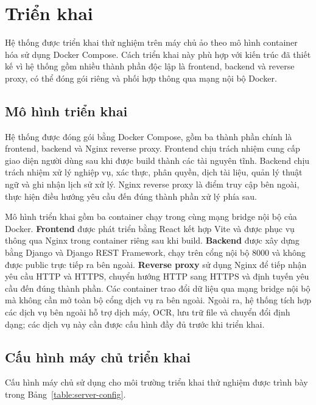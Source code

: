 ﻿\documentclass[../DoAn.tex]{subfiles}
\begin{document}
\section{Triển khai}

Hệ thống được triển khai thử nghiệm trên máy chủ ảo theo mô hình container hóa sử dụng Docker Compose. Cách triển khai này phù hợp với kiến trúc đã thiết kế vì hệ thống gồm nhiều thành phần độc lập là frontend, backend và reverse proxy, có thể đóng gói riêng và phối hợp thông qua mạng nội bộ Docker.

\subsection{Mô hình triển khai}

Hệ thống được đóng gói bằng Docker Compose, gồm ba thành phần chính là frontend, backend và Nginx reverse proxy. Frontend chịu trách nhiệm cung cấp giao diện người dùng sau khi được build thành các tài nguyên tĩnh. Backend chịu trách nhiệm xử lý nghiệp vụ, xác thực, phân quyền, dịch tài liệu, quản lý thuật ngữ và ghi nhận lịch sử xử lý. Nginx reverse proxy là điểm truy cập bên ngoài, thực hiện điều hướng yêu cầu đến đúng thành phần xử lý phía sau.

Mô hình triển khai gồm ba container chạy trong cùng mạng bridge nội bộ của Docker. \textbf{Frontend} được phát triển bằng React kết hợp Vite và được phục vụ thông qua Nginx trong container riêng sau khi build. \textbf{Backend} được xây dựng bằng Django và Django REST Framework, chạy trên cổng nội bộ 8000 và không được public trực tiếp ra bên ngoài. \textbf{Reverse proxy} sử dụng Nginx để tiếp nhận yêu cầu HTTP và HTTPS, chuyển hướng HTTP sang HTTPS và định tuyến yêu cầu đến đúng thành phần. Các container trao đổi dữ liệu qua mạng bridge nội bộ mà không cần mở toàn bộ cổng dịch vụ ra bên ngoài. Ngoài ra, hệ thống tích hợp các dịch vụ bên ngoài hỗ trợ dịch máy, OCR, lưu trữ file và chuyển đổi định dạng; các dịch vụ này cần được cấu hình đầy đủ trước khi triển khai.

\subsection{Cấu hình máy chủ triển khai}

Cấu hình máy chủ sử dụng cho môi trường triển khai thử nghiệm được trình bày trong Bảng~\ref{table:server-config}.
\end{document}
